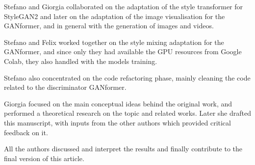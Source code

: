 \documentclass{article}
\begin{document}
	Stefano and Giorgia collaborated on the adaptation of the style transformer for StyleGAN2 and later 
	on the adaptation of the image visualisation for the GANformer, and in general with the generation 
	of images and videos. 
	
	Stefano and Felix worked together on the style mixing adaptation for the GANformer, and since only 
	they had available the GPU resources from Google Colab, they also handled with the models training.
	
	Stefano also concentrated on the code refactoring phase, mainly cleaning the code related to the 
	discriminator GANformer.
	
	Giorgia focused on the main conceptual ideas behind the original work, and performed a theoretical 
	research on the topic and related works. 
	Later she drafted this manuscript, with inputs from the other authors which provided critical 
	feedback on it. 
	
	All the authors discussed and interpret the results and finally contribute to the final version of this 
	article.
	
\end{document}
